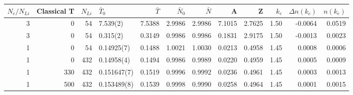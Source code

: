 \begin{tabular}{rrrlrrrrrrrr}
\toprule
 $N_e/N_{Li}$ &  Classical T &  $N_{Li}$ &    $\bar{T}_0$ &  $\bar{T}$ &  $\bar{N}_0$ &  $\bar{N}$ &       A &       Z &  $k_c$ &  $\Delta n(k_c)$ &  $n(k_c)$ \\
\midrule
            3 &            0 &        54 &       7.539(2) &     7.5388 &       2.9986 &     2.9986 &  7.1015 &  2.7625 &   1.50 &          -0.0064 &    0.0519 \\
            3 &            0 &        54 &       0.315(2) &     0.3149 &       0.9986 &     0.9986 &  0.1831 &  2.9175 &   1.50 &          -0.0013 &    0.0023 \\
            1 &            0 &        54 &     0.14925(7) &     0.1488 &       1.0021 &     1.0030 &  0.0213 &  0.4958 &   1.45 &           0.0008 &    0.0006 \\
            1 &            0 &       432 &     0.14958(4) &     0.1494 &       0.9986 &     0.9989 &  0.0220 &  0.4959 &   1.45 &           0.0005 &    0.0009 \\
            1 &          330 &       432 &    0.151647(7) &     0.1519 &       0.9996 &     0.9992 &  0.0236 &  0.4961 &   1.45 &           0.0003 &    0.0013 \\
            1 &          500 &       432 &    0.153489(8) &     0.1539 &       0.9998 &     0.9990 &  0.0258 &  0.4964 &   1.45 &           0.0001 &    0.0015 \\
\bottomrule
\end{tabular}
